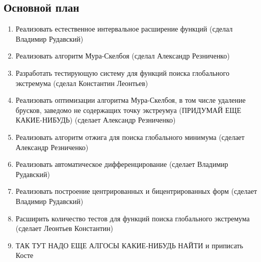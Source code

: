 \documentclass[a4paper,12pt]{extarticle}
\begin{document}
\subsection*{Основной план}
\begin{enumerate}
	\item Реализовать естественное интервальное расширение функций (сделал Владимир Рудавский) 
	\item Реализовать алгоритм Мура-Скелбоя (сделал Александр Резниченко)
	\item Разработать тестирующую систему для функций поиска глобального экстремума (сделал Константин Леонтьев)
	\item Реализовать оптимизации алгоритма Мура-Скелбоя, в том числе удаление брусков, заведомо не содержащих точку экстреумуа (ПРИДУМАЙ ЕЩЕ КАКИЕ-НИБУДЬ) (сделает Александр Резниченко)
	\item Реализовать алгоритм отжига для поиска глобального минимума (сделает Александр Резниченко)
	\item Реализовать автоматическое дифференцирование (сделает Владимир Рудавский)
	\item Реализовать построение центрированных и бицентрированных форм (сделает Владимир Рудавский)
	\item Расширить количество тестов для функций поиска глобального экстремума (сделает Леонтьев Константин)
	\item ТАК ТУТ НАДО ЕЩЕ АЛГОСЫ КАКИЕ-НИБУДЬ НАЙТИ и приписать Косте
\end{enumerate}

	
\newpage 
\printbibliography[heading=bibintoc] 

	
	
\end{document}
